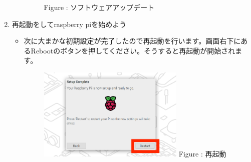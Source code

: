 \documentclass[a4paper,12pt]{jarticle}
\begin{document}
\begin{enumerate}
\begin{itemize}
\begin{figure}[h]
\begin{minipage}{5.228cm}
{                            \newline
                            Figure {\theFigure\label{seq:refFigure18}}:
                            ソフトウェアアップデート}
                        \end{minipage}
                      \end{figure}
                  \end{itemize}  
    \item
        再起動をしてraspberry piを始めよう
                \begin{itemize}
                  \item
                        次に大まかな初期設定が完了したので再起動を行います。画面右下にあるRebootのボタンを押してください。そうすると再起動が開始されます。
                        \begin{figure}[h]
                          \centering
                          \begin{minipage}{5.228cm}
                            {\upshape
                              \includegraphics[width=7.000cm]{sw_image08.png}
                              \newline
                              Figure {\theFigure\label{seq:refFigure19}}:
                              再起動}
                          \end{minipage}
                        \end{figure}
                      \end{itemize}  
                
\end{enumerate}
\end{document}
